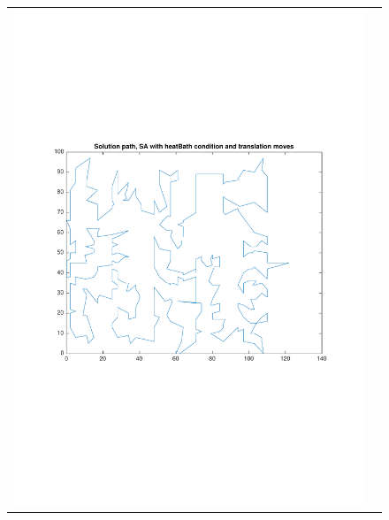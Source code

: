 \documentclass[a4paper, 11pt]{scrartcl}
\begin{document}
\begin{figure}[!ht]
\begin{tabular}{cc}
    \includegraphics[scale=0.4, trim={3cm 6cm 1cm 6cm}]{../figures/solutionPath_SA_heatBath_translation.pdf} \\ 

\end{tabular}
\end{figure}
\end{document}
